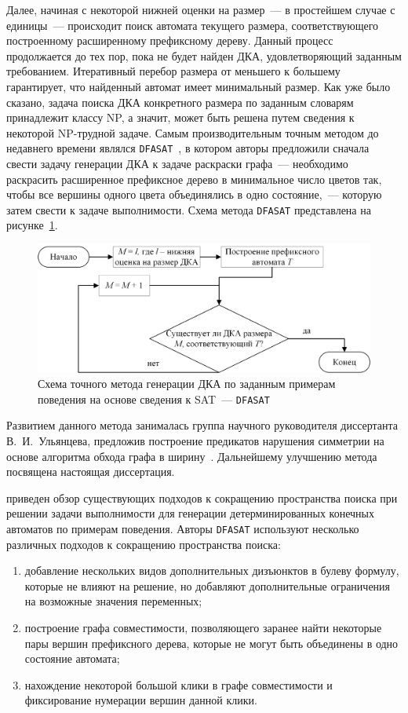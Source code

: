 Далее, начиная с некоторой нижней оценки на размер~--- в простейшем случае с единицы~--- происходит поиск автомата текущего размера, соответствующего построенному расширенному префиксному дереву. 
Данный процесс продолжается до тех пор, пока не будет найден ДКА, удовлетворяющий заданным требованием.
Итеративный перебор размера от меньшего к большему гарантирует, что найденный автомат имеет минимальный размер.
Как уже было сказано, задача поиска ДКА конкретного размера по заданным словарям принадлежит классу NP, а значит, может быть решена путем сведения к некоторой NP-трудной задаче.
Самым производительным точным методом до недавнего времени являлся \texttt{DFASAT}~\cite{heule-icgi10}, в котором авторы предложили сначала свести задачу генерации ДКА к задаче раскраски графа~--- необходимо раскрасить расширенное префиксное дерево в минимальное число цветов так, чтобы все вершины одного цвета объединялись в одно состояние,~--- которую затем свести к задаче выполнимости.
Схема метода \texttt{DFASAT} представлена на рисунке~\ref{syn:img:dfasat-algo}.

\begin{figure}[ht]
  \centering
  \includegraphics[scale=0.6]{img/ntv/basic.jpg}
  \caption{Схема точного метода генерации ДКА по заданным примерам поведения на основе сведения к SAT~--- \texttt{DFASAT}}
  \label{syn:img:dfasat-algo}
\end{figure}

Развитием данного метода занималась группа научного руководителя диссертанта В.~И.~Ульянцева, предложив построение предикатов нарушения симметрии на основе алгоритма обхода графа в ширину~\cite{zakirzyanov2015LATA}.
Дальнейшему улучшению метода посвящена настоящая диссертация.

\insection{\ref{sec:review:sym-breaking}} приведен обзор существующих подходов к сокращению пространства поиска при решении задачи выполнимости для генерации детерминированных конечных автоматов по примерам поведения.
Авторы \texttt{DFASAT} используют несколько различных подходов к сокращению пространства поиска:
\begin{enumerate}
  \item добавление нескольких видов дополнительных дизъюнктов в булеву формулу, которые не влияют на решение, но добавляют дополнительные ограничения на возможные значения переменных;
  \item построение графа совместимости, позволяющего заранее найти некоторые пары вершин префиксного дерева, которые не могут быть объединены в одно состояние автомата;
  \item нахождение некоторой большой клики в графе совместимости и фиксирование нумерации вершин данной клики.
\end{enumerate}

